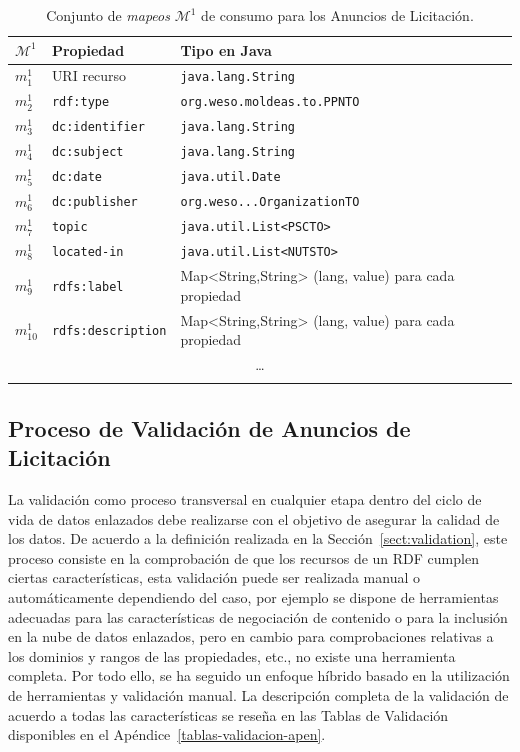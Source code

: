 \begin{longtable}[c]{|p{2cm}|p{6cm}|p{6cm}|} 
\hline
  \textbf{$\mathcal{M}^1$} &  \textbf{Propiedad} & \textbf{Tipo en Java} \\\hline
\endhead
 $m^1_1$ & URI recurso     		& \texttt{java.lang.String} \\ \hline
 $m^1_2$ & \texttt{rdf:type}      	& \texttt{org.weso.moldeas.to.PPNTO} \\ \hline
 $m^1_3$ & \texttt{dc:identifier} 	& \texttt{java.lang.String} \\ \hline
 $m^1_4$ & \texttt{dc:subject}    	& \texttt{java.lang.String} \\ \hline
 $m^1_5$ & \texttt{dc:date}    		& \texttt{java.util.Date} \\ \hline
 $m^1_6$ & \texttt{dc:publisher}	& \texttt{org.weso...OrganizationTO} \\ \hline 
 $m^1_7$ & \texttt{topic} 		& \texttt{java.util.List<PSCTO> } \\ \hline
 $m^1_8$ & \texttt{located-in} 		& \texttt{java.util.List<NUTSTO> }\\ \hline
 $m^1_{9}$ &  \texttt{rdfs:label}  & Map<String,String> (lang, value) para cada propiedad \\ \hline   
 $m^1_{10}$ &  \texttt{rdfs:description}  & Map<String,String> (lang, value) para cada propiedad \\ \hline   
  \multicolumn{3}{|c|}{\ldots} \\ \hline
\hline
\caption{Conjunto de \textit{mapeos} $\mathcal{M}^1$ de consumo para los Anuncios de Licitación.}\label{table:ppn-consumo}\\    
\end{longtable}

\subsection{Proceso de Validación de Anuncios de Licitación}
La validación como proceso transversal en cualquier etapa dentro del ciclo de vida de datos 
enlazados debe realizarse con el objetivo de asegurar la calidad de los datos. De acuerdo a la 
definición realizada en la Sección~\ref{sect:validation}, este proceso consiste en la comprobación 
de que los recursos de un \dataset RDF cumplen ciertas características, esta validación puede ser realizada manual o automáticamente dependiendo del caso, por ejemplo se dispone 
de herramientas adecuadas para las características de negociación de contenido o para la inclusión en la nube de datos enlazados, pero 
en cambio para comprobaciones relativas a los dominios y rangos de las propiedades, etc., no existe una 
herramienta completa. Por todo ello, se ha seguido un enfoque híbrido basado en la utilización de herramientas 
y validación manual. La descripción completa de la validación de acuerdo a todas las características 
se reseña en las Tablas de Validación disponibles en el Apéndice~\ref{tablas-validacion-apen}.
% 
